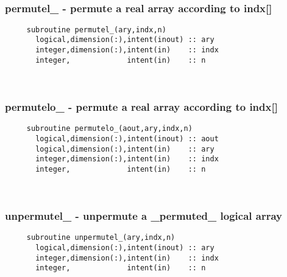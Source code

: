  
\mbox{}\hrulefill\ 
 

  \subsubsection{permutel\_ - permute a real array according to indx[]}

\begin{verbatim} 
     subroutine permutel_(ary,indx,n)
       logical,dimension(:),intent(inout) :: ary
       integer,dimension(:),intent(in)    :: indx
       integer,             intent(in)    :: n
 \end{verbatim}%
 
 
\mbox{}\hrulefill\ 

  \subsubsection{permutelo\_ - permute a real array according to indx[]}

\begin{verbatim} 
     subroutine permutelo_(aout,ary,indx,n)
       logical,dimension(:),intent(inout) :: aout
       logical,dimension(:),intent(in)    :: ary
       integer,dimension(:),intent(in)    :: indx
       integer,             intent(in)    :: n
 \end{verbatim}%
 
 
\mbox{}\hrulefill\ 
 
  \subsubsection{unpermutel\_ - unpermute a \_permuted\_ logical array}

\begin{verbatim} 
     subroutine unpermutel_(ary,indx,n)
       logical,dimension(:),intent(inout) :: ary
       integer,dimension(:),intent(in)    :: indx
       integer,             intent(in)    :: n
 \end{verbatim}%
 
